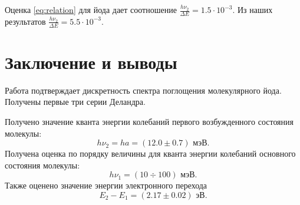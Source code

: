 \documentclass[12pt,a4paper]{article}
\begin{document}
	Оценка \eqref{eq:relation} для йода дает соотношение $\frac{h \nu_2}{\Delta E} = 1.5 \cdot 10^{-3}$. Из наших результатов $\frac{h \nu_2}{\Delta E} = 5.5 \cdot 10^{-3}$.
	\section*{Заключение и выводы}
	
	Работа подтверждает дискретность спектра поглощения молекулярного йода. Получены первые три серии Деландра.
	
	Получено значение кванта энергии колебаний первого возбужденного состояния молекулы:
	$$h \nu_2 = h a = (12.0 \pm 0.7) \text{ мэВ}.$$
	Получена оценка по порядку величины для кванта энергии колебаний основного состояния молекулы:
	$$h \nu_1 = (10 \div 100) \text{ мэВ}. $$
	Также оценено значение энергии электронного перехода
	$$E_2 - E_1 = (2.17 \pm 0.02) \text{ эВ}. $$

	
\end{document}
